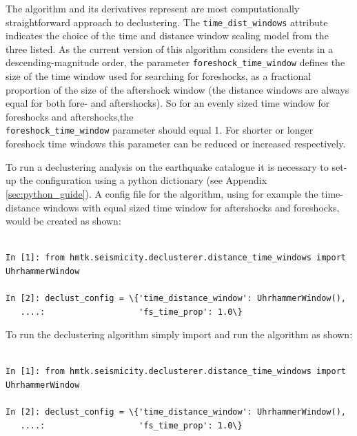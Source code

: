 The \cite{GardnerKnopoff1974} algorithm and its derivatives represent 
are most computationally straightforward approach to declustering. The \verb=time_dist_windows= attribute indicates the choice of the 
time and distance window scaling model from the three listed. As 
the current version of this algorithm considers the events in a 
descending-magnitude order, the parameter \verb=foreshock_time_window= 
defines the size of the time window used for searching for foreshocks, 
as a fractional proportion of the size of the aftershock window (the 
distance windows are always equal for both fore- and aftershocks). 
So for an evenly sized time window for foreshocks and aftershocks,the\\
\verb=foreshock_time_window= parameter should equal 1. For shorter or longer 
foreshock time windows this parameter can be reduced or increased respectively.

To run a declustering analysis on the earthquake catalogue it is necessary to set-up the configuration using a python dictionary (see Appendix \ref{sec:python_guide}). A config file for the \cite{GardnerKnopoff1974} algorithm, using for example the \cite{Uhrhammer1986} time-distance windows with equal sized time window for aftershocks and foreshocks, would be created as shown:

\begin{Verbatim}[frame=single, commandchars=\\\{\}, fontsize=\scriptsize, samepage=true]

In [1]: from hmtk.seismicity.declusterer.distance_time_windows import UhrhammerWindow

In [2]: declust_config = \{'time_distance_window': UhrhammerWindow(),
   ....:                   'fs_time_prop': 1.0\}

\end{Verbatim}


To run the declustering algorithm simply import and run the algorithm as shown:

\begin{Verbatim}[frame=single, commandchars=\\\{\}, fontsize=\scriptsize, samepage=true]

In [1]: from hmtk.seismicity.declusterer.distance_time_windows import UhrhammerWindow

In [2]: declust_config = \{'time_distance_window': UhrhammerWindow(),
   ....:                   'fs_time_prop': 1.0\}

\end{Verbatim}


